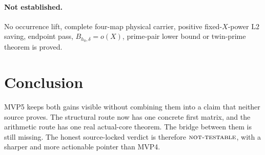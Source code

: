 \documentclass[11pt]{article}
\theoremstyle{definition}
\theoremstyle{remark}
\newcommand{\Ltwo}{\mathrm{L2}}
\newcommand{\NT}{\textnormal{\textsc{not-testable}}}
\newcommand{\Bhard}{B_{h_0,\delta}}
\begin{document}
\paragraph{Not established.}
No occurrence lift, complete four-map physical carrier, positive
fixed-\(X\)-power \(\Ltwo\) saving, endpoint pass,
\(\Bhard=o(X)\), prime-pair lower bound or twin-prime theorem is
proved.

\section{Conclusion}

MVP5 keeps both gains visible without combining them into a claim that
neither source proves.  The structural route now has one concrete
first matrix, and the arithmetic route has one real actual-core
theorem.  The bridge between them is still missing.  The honest
source-locked verdict is therefore \(\NT\), with a sharper and more
actionable pointer than MVP4.



\end{document}
